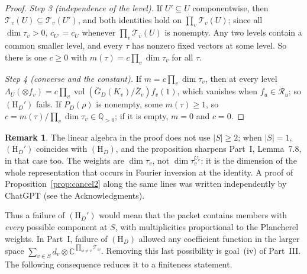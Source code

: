 \documentclass[12pt]{article}
\newcommand{\ov}[1]{\overline{#1}}
\newcommand{\C}{\mathbb{C}}
\newcommand{\vol}{\operatorname{vol}}
\newcommand{\Zb}{\ov{Z}}
\newcommand{\GDb}{\ov{G}_D}
\theoremstyle{plain}
\theoremstyle{definition}
\newtheorem{remark}[theorem]{Remark}
\begin{document}
\begin{proof}
\emph{Step 3 (independence of the level).} If $U'\subseteq U$ componentwise, then $\mathcal T_v(U)\subseteq\mathcal T_v(U')$, and both identities hold on $\prod_v\mathcal T_v(U)$; since all $\dim\tau_v>0$, $c_{U'}=c_U$ whenever $\prod_v\mathcal T_v(U)$ is nonempty. Any two levels contain a common smaller level, and every $\tau$ has nonzero fixed vectors at some level. So there is one $c\ge0$ with $m(\tau)=c\prod_v\dim\tau_v$ for all $\tau$.

\emph{Step 4 (converse and the constant).} If $m=c\prod_v\dim\tau_v$, then at every level $\Lambda_U(\otimes f_v)=c\prod_v\vol(\GDb(K_v)/\Zb_v)f_v(1)$, which vanishes when $f_u\in\mathcal R_u$; so $(\mathrm H_D')$ fails. If $P_D(\rho)$ is nonempty, some $m(\tau)\ge1$, so $c=m(\tau)/\prod_v\dim\tau_v\in\mathbb Q_{>0}$; if it is empty, $m=0$ and $c=0$.
\end{proof}

\begin{remark}
The linear algebra in the proof does not use $|S|\ge2$; when $|S|=1$, $(\mathrm H_D')$ coincides with $(\mathrm H_D)$, and the proposition sharpens Part~I, Lemma~7.8, in that case too. The weights are $\dim\tau_v$, not $\dim\tau_v^{U_v}$: it is the dimension of the whole representation that occurs in Fourier inversion at the identity. A proof of Proposition~\ref{prop:cancel2} along the same lines was written independently by ChatGPT (see the Acknowledgments).
\end{remark}

Thus a failure of $(\mathrm H_D')$ would mean that the packet contains members with \emph{every} possible component at $S$, with multiplicities proportional to the Plancherel weights. In Part~I, failure of $(\mathrm H_D)$ allowed any coefficient function in the larger space $\sum_{v\in S}d_v\otimes\C^{\prod_{w\ne v}\mathcal T_w}$. Removing this last possibility is goal~(iv) of Part~III. The following consequence reduces it to a finiteness statement.
\end{document}
